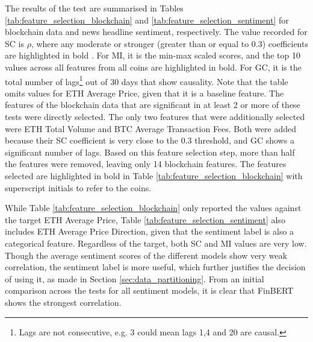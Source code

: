 \documentclass[ %
                    author={Raj Dhakan},
                supervisor={Dr. Ayush Joshi},
                    degree={MSc},
                     title={Ethereum Price Prediction using Internal and External Factors},
                  subtitle={},
                      type={},
                      year={2025}]{dissertation}
\begin{document}
The results of the test are summarised in Tables \ref{tab:feature_selection_blockchain} and \ref{tab:feature_selection_sentiment} for blockchain data and news headline sentiment, respectively. The value recorded for SC is $\rho$, where any moderate or stronger (greater than or equal to 0.3) coefficients are highlighted in bold \cite{rovetta2020raiders}. For MI, it is the min-max scaled scores, and the top 10 values across all features from all coins are highlighted in bold. For GC, it is the total number of lags\footnote{Lags are not consecutive, e.g. 3 could mean lags 1,4 and 20 are causal.} out of 30 days that show causality. Note that the table omits values for ETH Average Price, given that it is a baseline feature. The features of the blockchain data that are significant in at least 2 or more of these tests were directly selected. The only two features that were additionally selected were ETH Total Volume and BTC Average Transaction Fees. Both were added because their SC coefficient is very close to the 0.3 threshold, and GC shows a significant number of lags. Based on this feature selection step, more than half the features were removed, leaving only 14 blockchain features. The features selected are highlighted in bold in Table \ref{tab:feature_selection_blockchain} with superscript initials to refer to the coins.

While Table \ref{tab:feature_selection_blockchain} only reported the values against the target ETH Average Price, Table \ref{tab:feature_selection_sentiment} also includes ETH Average Price Direction, given that the sentiment label is also a categorical feature. Regardless of the target, both SC and MI values are very low. Though the average sentiment scores of the different models show very weak correlation, the sentiment label is more useful, which further justifies the decision of using it, as made in Section \ref{sec:data_partitioning}. From an initial comparison across the tests for all sentiment models, it is clear that FinBERT shows the strongest correlation.
\end{document}
